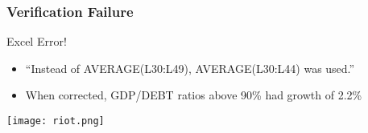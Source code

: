 \documentclass[mathserif]{beamer}
\begin{document}
\begin{frame}
  \frametitle{Verification Failure}
  \begin{block}{Excel Error!}
    \begin{itemize}
     \item ``Instead of AVERAGE(L30:L49), AVERAGE(L30:L44) was used.''
     \item When corrected, GDP/DEBT ratios above 90\% had growth of 2.2\%
    \end{itemize}
  \end{block}

 \begin{center}
  \center
  \texttt{[image: riot.png]}\\
 \end{center}
 
\end{frame}


 
\end{document}
